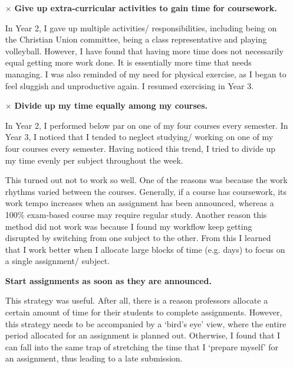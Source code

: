 \begin{itemize}
	\item[$\times$] \textbf{Give up extra-curricular activities to gain time for coursework.}
	
	In Year 2, I gave up multiple activities/ responsibilities, including being on the Christian Union committee, being a class representative and playing volleyball.
	However, I have found that having more time does not necessarily equal getting more work done.
	It is essentially more time that needs managing.
	I was also reminded of my need for physical exercise, as I began to feel sluggish and unproductive again.
	I resumed exercising in Year 3.


		
	\item[$\times$] \textbf{Divide up my time equally among my courses.}
	
	In Year 2, I performed below par on one of my four courses every semester.
	In Year 3, I noticed that I tended to neglect studying/ working on one of my four courses every semester.
	Having noticed this trend, I tried to divide up my time evenly per subject throughout the week.
	
	This turned out not to work so well.
	One of the reasons was because the work rhythms varied between the courses.
	Generally, if a course has coursework, its work tempo increases when an assignment has been announced, whereas a 100\% exam-based course may require regular study.
	Another reason this method did not work was because I found my workflow keep getting disrupted by switching from one subject to the other.
	From this I learned that I work better when I allocate large blocks of time (e.g. days) to focus on a single assignment/ subject.

	\item[\checkmark] \textbf{Start assignments as soon as they are announced.}
	
	This strategy was useful.
	After all, there is a reason professors allocate a certain amount of time for their students to complete assignments.
	However, this strategy needs to be accompanied by a `bird's eye' view, where the entire period allocated for an assignment is planned out.
	Otherwise, I found that I can fall into the same trap of stretching the time that I `prepare myself' for an assignment, thus leading to a late submission.
	

\end{itemize}
